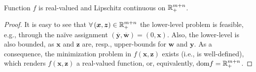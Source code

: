\documentclass[12pt]{article}
\begin{document}
\begin{lemma}\label{lemma:f-lip-cont}
    Function $f$ is real-valued and Lipschitz continuous on $\mathbb{R}^{m+n}_{+}$.
\end{lemma}
\begin{proof}
    It is easy to see that $\forall \left( \bm{x},\bm{z} \right) \in \mathbb{R}^{m+n}_{+}$ the lower-level problem is feasible, e.g., through the naïve assignment $(\overline{\bm{y}},\overline{\bm{w}})=(0,\bm{x})$.
    Also, the lower-level is also bounded, as $\bm{x}$ and $\bm{z}$ are, resp., upper-bounds for $\bm{w}$ and $\bm{y}$.
    As a consequence, the minimization problem in $f(\bm{x},\bm{z})$ exists (i.e., is well-defined), which renders $f(\bm{x},\bm{z})$ a real-valued function, or, equivalently, $\text{dom} f = \mathbb{R}^{m+n}_{+}$.


\end{proof}
\end{document}
